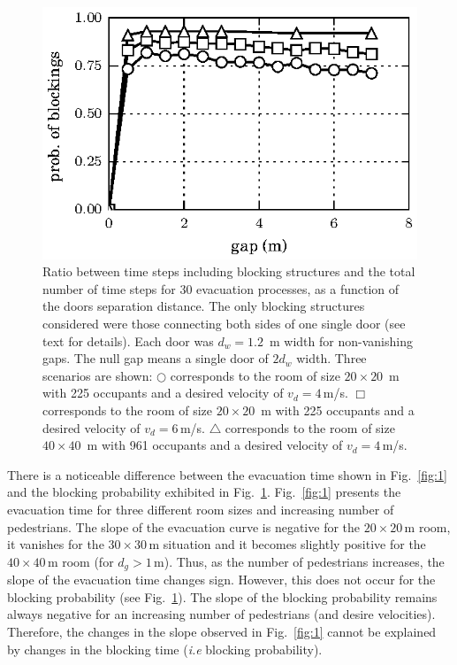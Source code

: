 \begin{figure}
\includegraphics[width=\columnwidth]{./fig13.eps}
\caption{\label{fig:15} Ratio between time steps including blocking structures 
and the total number of time steps for 30 evacuation processes, as a function 
of the doors separation distance. The only blocking structures considered 
were those connecting both sides of one single door (see text for details). 
Each door was $d_w=1.2$~m width for non-vanishing gaps. The null gap means a 
single door of $2d_w$ width. Three scenarios are shown: $\bigcirc$ 
corresponds to the room of size $20\times20$~m with 225 occupants and a 
desired velocity of $v_d=4\,$m/s. $\Box$ corresponds to the room of size  
$20\times20$~m with 225 occupants and a desired velocity of $v_d=6\,$m/s. 
$\bigtriangleup$ corresponds to the room of size $40\times40$~m with 961 
occupants and a desired velocity of $v_d=4\,$m/s.   }
\end{figure}

There is a noticeable difference between the evacuation time 
shown in Fig.~\ref{fig:1} and the blocking probability exhibited in 
Fig.~\ref{fig:15}. Fig.~\ref{fig:1} presents the evacuation time for three 
different room sizes and increasing number of pedestrians.  The slope of the 
evacuation curve is negative for the $20\times20\,$m room, it vanishes for 
the $30\times30\,$m situation and it becomes slightly positive for the 
$40\times40\,$m room (for $d_g>1\,$m). Thus, as the number of pedestrians 
increases, the slope of the evacuation time changes sign. However, this does not 
occur for the blocking probability (see Fig.~\ref{fig:15}). The slope of the 
blocking probability remains always negative for an increasing number of 
pedestrians (and desire velocities). Therefore, the changes in the slope 
observed in Fig.~\ref{fig:1} cannot be explained by changes in the blocking 
time (\textit{i.e} blocking probability).   \\

